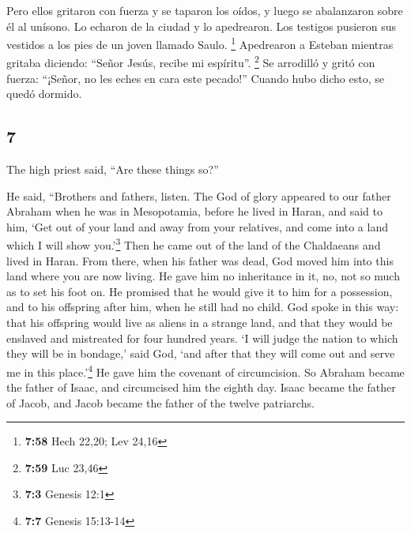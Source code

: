 \begin{paracol}{2}
 Pero ellos gritaron con fuerza y se taparon los oídos, y
luego se abalanzaron sobre él al unísono.  Lo echaron de
la ciudad y lo apedrearon. Los testigos pusieron sus vestidos a los pies
de un joven llamado Saulo. \footnote{\textbf{7:58} Hech 22,20; Lev 24,16}
 Apedrearon a Esteban mientras gritaba diciendo: ``Señor
Jesús, recibe mi espíritu''. \footnote{\textbf{7:59} Luc 23,46}
 Se arrodilló y gritó con fuerza: ``¡Señor, no les eches
en cara este pecado!'' Cuando hubo dicho esto, se quedó dormido.

\switchcolumn
\begin{otherlanguage}{english}

\hypertarget{section-13}{%
\section{7}\label{section-13}}

 The high priest said, ``Are these things so?''

 He said, ``Brothers and fathers, listen. The God of glory
appeared to our father Abraham when he was in Mesopotamia, before he
lived in Haran,  and said to him, `Get out of your land
and away from your relatives, and come into a land which I will show
you.'\footnote{\textbf{7:3} Genesis 12:1}  Then he came
out of the land of the Chaldaeans and lived in Haran. From there, when
his father was dead, God moved him into this land where you are now
living.  He gave him no inheritance in it, no, not so much
as to set his foot on. He promised that he would give it to him for a
possession, and to his offspring after him, when he still had no child.
 God spoke in this way: that his offspring would live as
aliens in a strange land, and that they would be enslaved and mistreated
for four hundred years.  `I will judge the nation to which
they will be in bondage,' said God, `and after that they will come out
and serve me in this place.'\footnote{\textbf{7:7} Genesis 15:13-14}
 He gave him the covenant of circumcision. So Abraham
became the father of Isaac, and circumcised him the eighth day. Isaac
became the father of Jacob, and Jacob became the father of the twelve
patriarchs.


\end{otherlanguage}
\end{paracol}
